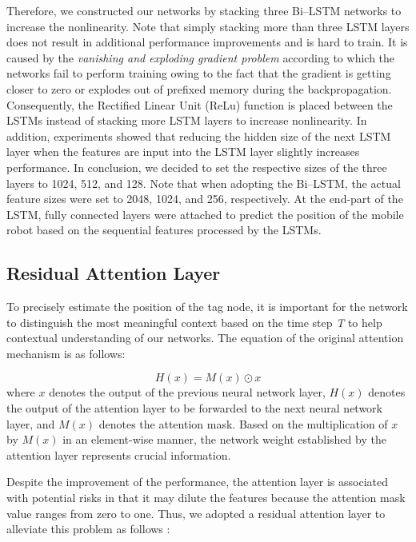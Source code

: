 \documentclass[letterpaper, 10 pt, conference]{ieeeconf}
\begin{document}
Therefore, we constructed our networks by stacking three Bi--LSTM networks to increase the nonlinearity. Note that simply stacking more than three LSTM layers does not result in additional performance improvements and is hard to train. It is caused by the \textit{vanishing and exploding gradient problem} \cite{hochreiter2001gradient, pascanu2013difficulty, pascanu2012understanding} according to which the networks fail to perform training owing to the fact that the gradient is getting closer to zero or explodes out of prefixed memory during the backpropagation. Consequently, the Rectified Linear Unit (ReLu) function is placed between the LSTMs \cite{nair2010rectified} instead of stacking more LSTM layers to increase nonlinearity. In addition, experiments showed that reducing the hidden size of the next LSTM layer when the features are input into the LSTM layer slightly increases performance. In conclusion, we decided to set the respective sizes of the three layers to 1024, 512, and 128. Note that when adopting the Bi--LSTM, the actual feature sizes were set to 2048, 1024, and 256, respectively. At the end-part of the LSTM, fully connected layers were attached to predict the position of the mobile robot based on the sequential features processed by the LSTMs.  

\subsection{Residual Attention Layer}

To precisely estimate the position of the tag node, it is important for the network to distinguish the most meaningful context based on the time step \textit{T} to help contextual understanding of our networks. The equation of the original attention mechanism is as follows:   

\begin{equation}
H(x)=M(x)\odot x
\end{equation} 
where $x$ denotes the output of the previous neural network layer, $H(x)$ denotes the output of the attention layer to be forwarded to the next neural network layer, and $M(x)$ denotes the attention mask. Based on the multiplication of $x$ by $M(x)$ in an element-wise manner, the network weight established by the attention layer represents crucial information. 

Despite the improvement of the performance, the attention layer is associated with potential risks in that it may dilute the features because the attention mask value ranges from zero to one. Thus, we adopted a residual attention layer to alleviate this problem as follows \cite{wang2017residual}:
\end{document}
